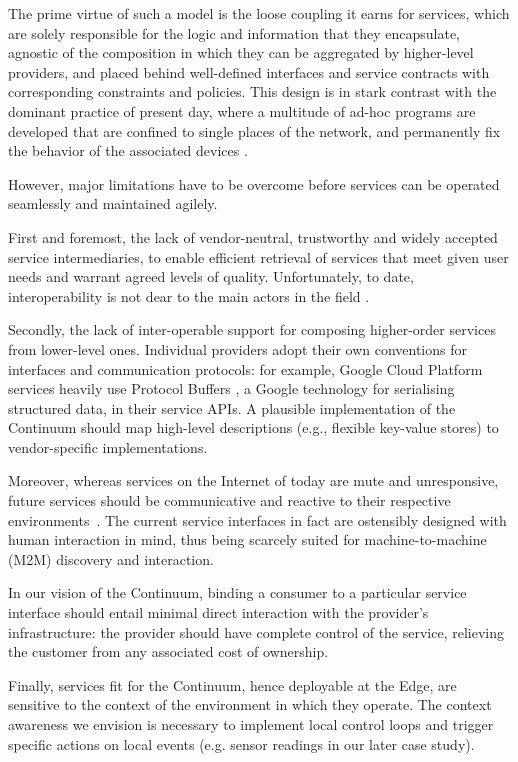 The prime virtue of such a model is the loose coupling it earns for services, which are solely responsible for the logic and information that they encapsulate, agnostic of the composition in which they can be aggregated by higher-level providers, and placed behind well-defined interfaces and service contracts with corresponding constraints and policies.
This design is in stark contrast with the dominant practice of present day, where a multitude of ad-hoc programs are developed that are confined to single places of the network, and permanently fix the behavior of the associated devices \cite{beckman2020harnessing}.

However, major limitations have to be overcome before services can be operated seamlessly and maintained agilely.  

First and foremost, the lack of vendor-neutral, trustworthy and widely accepted service intermediaries, to enable efficient retrieval of services that meet given user needs and warrant agreed levels of quality. Unfortunately, to date, interoperability is not dear to the main actors in the field \cite{grozev2014inter}.

Secondly, the lack of inter-operable support for composing higher-order services from lower-level ones. 
Individual providers adopt their own conventions for interfaces and communication protocols: for example, Google Cloud Platform services heavily use Protocol Buffers \cite{protobuf}, a Google technology for serialising structured data, in their service APIs. 
A plausible implementation of the Continuum should map high-level descriptions (e.g., flexible key-value stores) to vendor-specific implementations.

Moreover, whereas services on the Internet of today are mute and unresponsive, future services should be communicative and reactive to their respective environments~\cite{haller2008internet}. 
The current service interfaces in fact are ostensibly designed with human interaction in mind, thus being scarcely suited for machine-to-machine (M2M) discovery and interaction. 

In our vision of the Continuum, binding a consumer to a particular service interface should entail minimal direct interaction with the provider's infrastructure: the provider should have complete control of the service, relieving the customer from any associated cost of ownership.

Finally, services fit for the Continuum, hence deployable at the Edge, are sensitive to the context of the environment in which they operate.
The context awareness we envision is necessary to implement local control loops and trigger specific actions on local events (e.g. sensor readings in our later case study).

